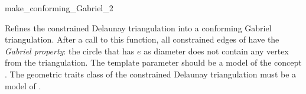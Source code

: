 \begin{ccRefFunction}{make_conforming_Gabriel_2}


{ Refines the constrained Delaunay triangulation  into a
  conforming Gabriel triangulation. After a call to this function, all
  constrained edges of  have the \emph{Gabriel property}: the
  circle that has $e$ as diameter does not contain any vertex from
  the triangulation.  
  \ccRequire The template parameter  should be a model of the
  concept . The geometric
  traits class of the constrained Delaunay triangulation must be a
  model of .} 

\end{ccRefFunction}


